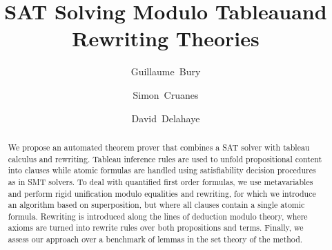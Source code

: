 \documentclass[orivec]{llncs}
\begin{document}
\title{SAT Solving Modulo Tableau\break{}and Rewriting Theories}

\author{Guillaume~Bury \and Simon~Cruanes \and
David~Delahaye}


\maketitle

\begin{abstract}
We propose an automated theorem prover that combines a SAT solver with tableau
calculus and rewriting. Tableau inference rules are used to unfold propositional
content into clauses while atomic formulas are handled using satisfiability
decision procedures as in SMT solvers. To deal with quantified first order
formulas, we use metavariables and perform rigid unification modulo equalities
and rewriting, for which we introduce an algorithm based on superposition, but
where all clauses contain a single atomic formula. Rewriting is introduced along
the lines of deduction modulo theory, where axioms are turned into rewrite rules
over both propositions and terms.  Finally, we assess our approach over a
benchmark of lemmas in the set theory of the \bmth{} method.

\end{abstract}









\end{document}
